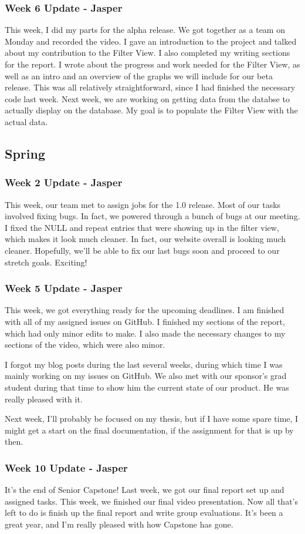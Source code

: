 \subsubsection{Week 6 Update - Jasper}
This week, I did my parts for the alpha release. 
We got together as a team on Monday and recorded the video. 
I gave an introduction to the project and talked about my contribution to the Filter View. 
I also completed my writing sections for the report. 
I wrote about the progress and work needed for the Filter View, as well as an intro and an overview of the graphs we will include for our beta release. 
This was all relatively straightforward, since I had finished the necessary code last week. 
Next week, we are working on getting data from the databse to actually display on the database. 
My goal is to populate the Filter View with the actual data.


\subsection{Spring}

\subsubsection{Week 2 Update - Jasper}
This week, our team met to assign jobs for the 1.0 release. 
Most of our tasks involved fixing bugs. 
In fact, we powered through a bunch of bugs at our meeting. 
I fixed ​the NULL and repeat entries that were showing up in the filter view, which makes it look much cleaner. 
In fact, our website overall is looking much cleaner. 
Hopefully, we'll be able to fix our last bugs soon and proceed to our stretch goals. 
Exciting!

\subsubsection{Week 5 Update - Jasper}
This week, we got everything ready for the upcoming deadlines. 
I am finished with all of my assigned issues on GitHub. 
I finished my sections of the report, which had only minor edits to make. 
I also made the necessary changes to my sections of the video, which were also minor.

I forgot my blog posts during the last several weeks, during which time I was mainly working on my issues on GitHub. 
We also met with our sponsor's grad student during that time to show him the current state of our product. 
He was really pleased with it.

Next week, I'll probably be focused on my thesis, but if I have some spare time, I might get a start on the final documentation, if the assignment for that is up by then.

\subsubsection{Week 10 Update - Jasper}
It's the end of Senior Capstone! 
Last week, we got our final report set up and assigned tasks. 
This week, we finished our final video presentation. 
Now all that's left to do is finish up the final report and write group evaluations. 
It's been a great year, and I'm really pleased with how Capstone has gone.
